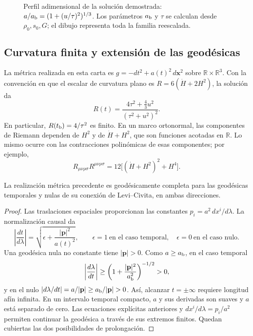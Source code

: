 \begin{figure}[htbp]
\centering
{}
\caption{Perfil adimensional de la solución demostrada:
\(a/a_{\rm b}=(1+(u/\tau)^2)^{1/3}\).
Los parámetros \(a_{\rm b}\) y \(\tau\) se calculan desde
\(\rho_0,s_0,G\); el dibujo representa toda la familia reescalada.}
\label{vii:fig:rebote-polvo}
\end{figure}

\subsection{Curvatura finita y extensión de las geodésicas}
La métrica realizada en esta carta es
\(g=-dt^2+a(t)^2\,d\mathbf x^2\) sobre
\(\mathbb R\times\mathbb R^3\). Con la convención en que
el escalar de curvatura plano es \(R=6(\dot H+2H^2)\), la solución da
\[
 R(t)=\frac{4\tau^2+\frac43u^2}{(\tau^2+u^2)^2}.
\]
En particular, \(R(t_{\rm b})=4/\tau^2\) es finito.
En un marco ortonormal, las componentes de Riemann dependen de
\(H^2\) y de \(\dot H+H^2\), que son funciones acotadas en
\(\mathbb R\). Lo mismo ocurre con las contracciones polinómicas
de esas componentes; por ejemplo,
\[
 R_{\mu\nu\rho\sigma}R^{\mu\nu\rho\sigma}
 =12\bigl[(\dot H+H^2)^2+H^4\bigr].
\]

\begin{proposition}
\label{vii:prop:completitud-causal-polvo}
La realización métrica precedente es geodésicamente completa
para las geodésicas temporales y nulas de su conexión de
Levi--Civita, en ambas direcciones.
\end{proposition}
\begin{proof}
Las traslaciones espaciales proporcionan las constantes
\(p_i=a^2\,dx^i/d\lambda\). La normalización causal da
\[
 \left|\frac{dt}{d\lambda}\right|
 =\sqrt{\epsilon+\frac{|\mathbf p|^2}{a(t)^2}},
 \qquad \epsilon=1\ \text{en el caso temporal},\quad
 \epsilon=0\ \text{en el caso nulo}.
\]
Una geodésica nula no constante tiene \(|\mathbf p|>0\).
Como \(a\geq a_{\rm b}\), en el caso temporal
\[
 \left|\frac{d\lambda}{dt}\right|
 \geq\left(1+\frac{|\mathbf p|^2}{a_{\rm b}^2}\right)^{-1/2}>0,
\]
y en el nulo
\(\left|d\lambda/dt\right|=a/|\mathbf p|
 \geq a_{\rm b}/|\mathbf p|>0\).
Así, alcanzar \(t=\pm\infty\) requiere longitud afín infinita.
En un intervalo temporal compacto, \(a\) y sus derivadas son
suaves y \(a\) está separado de cero. Las ecuaciones explícitas
anteriores y \(dx^i/d\lambda=p_i/a^2\) permiten continuar la
geodésica a través de sus extremos finitos. Quedan cubiertas
las dos posibilidades de prolongación.
\end{proof}

